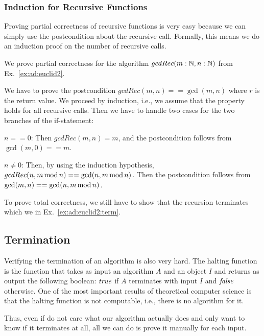\subsubsection{Induction for Recursive Functions}

Proving partial correctness of recursive functions is very easy because we can simply use the postcondition about the recursive call.
Formally, this means we do an induction proof on the number of recursive calls.

\begin{example}\label{ex:ad:euclid2:partcorr}
We prove partial correctness for the algorithm $gcdRec(m:\mathbb{N},n:\mathbb{N})$ from Ex.~\ref{ex:ad:euclid2}.

We have to prove the postcondition $gcdRec(m,n)==\gcd(m,n)$ where $r$ is the return value.
We proceed by induction, i.e., we assume that the property holds for all recursive calls.
Then we have to handle two cases for the two branches of the if-statement:
\begin{compactitem}
 \item $n==0$: Then $gcdRec(m,n)=m$, and the postcondition follows from $\gcd(m,0)==m$.
 \item $n\neq 0$: Then, by using the induction hypothesis, $gcdRec(n, m\mathop{\mathrm{mod}} n)==\gcd(n, m\mathop{\mathrm{mod}} n)$.
   Then the postcondition follows from $\gcd(m,n)==\gcd(n,m\mathop{\mathrm{mod}} n)$.
\end{compactitem}

To prove total correctness, we still have to show that the recursion terminates which we in Ex.~\ref{ex:ad:euclid2:term}.
\end{example}

\subsection{Termination}\label{sec:ad:termord}

Verifying the termination of an algorithm is also very hard.
The halting function is the function that takes as input an algorithm $A$ and an object $I$ and returns as output the following boolean: $\mathit{true}$ if $A$ terminates with input $I$ and $\mathit{false}$ otherwise.
One of the most important results of theoretical computer science is that the halting function is not computable, i.e., there is no algorithm for it.

Thus, even if do not care what our algorithm actually does and only want to know if it terminates at all, all we can do is prove it manually for each input.

